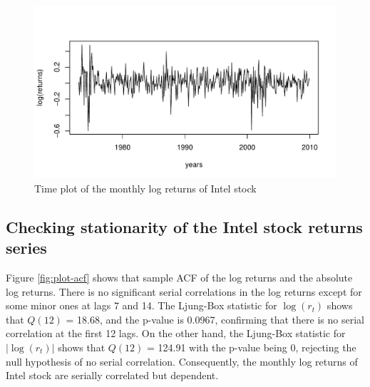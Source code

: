 \documentclass[a4paper,11pt]{article}\usepackage[]{graphicx}\usepackage[]{color}
\makeatletter
\def\maxwidth{ %
  \ifdim\Gin@nat@width>\linewidth
    \linewidth
  \else
    \Gin@nat@width
  \fi
}
\newenvironment{knitrout}{}{} %
\makeatother
\begin{document}
\begin{knitrout}
\color{fgcolor}\begin{figure}

{\centering \includegraphics[width=\maxwidth]{figure/plot-lnrtn-1} 

}

\caption[Time plot of the monthly log returns of Intel stock]{Time plot of the monthly log returns of Intel stock}\label{fig:plot-lnrtn}
\end{figure}


\end{knitrout}

\subsection*{Checking stationarity of the Intel stock returns series}



Figure \ref{fig:plot-acf} shows that sample ACF of the log returns and the absolute log returns. There is no significant serial correlations in the log returns except for some minor ones at lags 7 and 14. The Ljung-Box statistic for $\log(r_t)$ shows that $Q(12)$ = 18.68, and the p-value is 0.0967, confirming that there is no serial correlation at the first 12 lags. On the other hand, the Ljung-Box statistic for $|\log(r_t)|$ shows that $Q(12)$ = 124.91 with the p-value being 0, rejecting the null hypothesis of no serial correlation. Consequently, the monthly log returns of Intel stock are serially correlated but dependent. 
\end{document}
